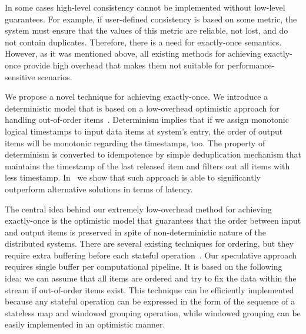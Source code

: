 \label{fs-phd-optimistic}

In some cases high-level consistency cannot be implemented without low-level guarantees. For example, if user-defined consistency is based on some metric, the system must ensure that the values of this metric are reliable, not lost, and do not contain duplicates. Therefore, there is a need for exactly-once semantics. However, as it was mentioned above, all existing methods for achieving exactly-once provide high overhead that makes them not suitable for performance-sensitive scenarios.

We propose a novel technique for achieving exactly-once. We introduce a deterministic model that is based on a low-overhead optimistic approach for handling out-of-order items~\cite{we2018seim}. Determinism implies that if we assign monotonic logical timestamps to input data items at system's entry, the order of output items will be monotonic regarding the timestamps, too. The property of determinism is converted to idempotence by simple deduplication mechanism that maintains the timestamp of the last released item and filters out all items with less timestamp. In~\cite{we2018beyondmr} we show that such approach is able to significantly outperform alternative solutions in terms of latency.

The central idea behind our extremely low-overhead method for achieving exactly-once is the optimistic model that guarantees that the order between input and output items is preserved in spite of non-deterministic nature of the distributed systems. There are several existing techniques for ordering, but they require extra buffering before each stateful operation~\cite{Li:2008:OPN:1453856.1453890}. Our speculative approach requires single buffer per computational pipeline. It is based on the following idea: we can assume that all items are ordered and try to fix the data within the stream if out-of-order items exist. This technique can be efficiently implemented because any stateful operation can be expressed in the form of the sequence of a stateless map and windowed grouping operation, while windowed grouping can be easily implemented in an optimistic manner.